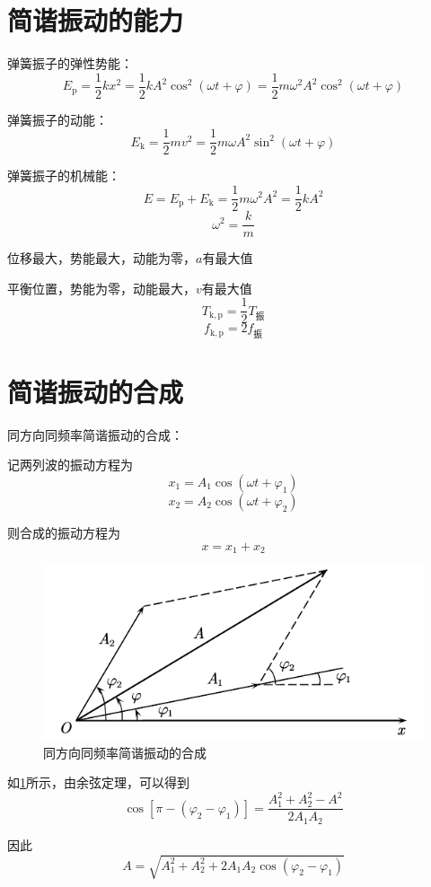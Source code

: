 \documentclass[12pt, a4paper, twoside]{ctexbook}
\begin{document}
\section{简谐振动的能力}
{\sonti 弹簧振子的弹性势能}：
$$
E_{\mathrm{p}}=\frac{1}{2}kx^2=\frac{1}{2}kA^2\cos^2\left(\omega t+\varphi\right)=\frac{1}{2}m\omega^2A^2\cos^2\left(\omega t+\varphi\right)
$$

{\sonti 弹簧振子的动能}：
$$
E_{\mathrm{k}}=\frac{1}{2}mv^2=\frac{1}{2}m\omega A^2\sin^2\left(\omega t+\varphi\right)
$$

{\sonti 弹簧振子的机械能}：
$$
E=E_{\mathrm{p}}+E_{\mathrm{k}}=\frac{1}{2}m\omega^2A^2=\frac{1}{2}kA^2
$$
$$
\omega^2=\frac{k}{m}
$$

位移最大，势能最大，动能为零，$a$有最大值

平衡位置，势能为零，动能最大，$v$有最大值
$$
T_\mathrm{k,p}=\frac{1}{2}T_\text{振}
$$
$$
f_\mathrm{k,p}=2f_\text{振}
$$
\section{简谐振动的合成}
{\sonti 同方向同频率简谐振动的合成}：

记两列波的振动方程为
$$
x_1=A_1\cos\left(\omega t+\varphi_1\right)
$$
$$
x_2=A_2\cos\left(\omega t+\varphi_2\right)
$$

则合成的振动方程为
$$
x=x_1+x_2
$$
\begin{figure}[H]
    \centerline{\includegraphics[scale=0.88]{同方向同频率简谐振动的合成.pdf}}
    \caption{同方向同频率简谐振动的合成}\label{fig:同方向同频率简谐振动的合成}
\end{figure}
如\textcolor{blue}{\cref{fig:同方向同频率简谐振动的合成}}所示，由余弦定理，可以得到
$$
\cos\left[\pi-\left(\varphi_2-\varphi_1\right)\right]=\frac{A_1^2+A_2^2-A^2}{2A_1A_2}
$$

因此
$$
A=\sqrt{A_1^2+A_2^2+2A_1A_2\cos\left(\varphi_2-\varphi_1\right)}
$$
\end{document}
